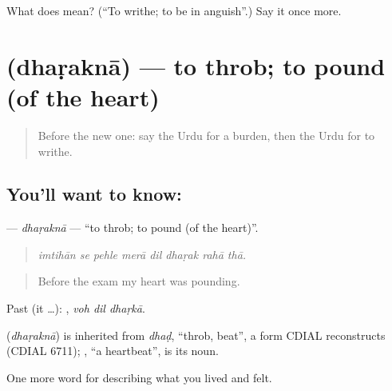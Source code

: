 \begin{tcolorbox}[breakable,colback=teal!4,colframe=teal!35!black,title={Before you move on}]
What does  mean? (\textquotedblleft{}To writhe; to be in anguish\textquotedblright{}.) Say it once more.
\end{tcolorbox}
\section[\texorpdfstring{\ur{دھڑکنا} (dhaṛaknā)}{دھڑکنا (dhaṛaknā)}]{ (dhaṛaknā) — to throb; to pound (of the heart)}

\label{lesson:UR-C446-dharakna}



\begin{quote}
Before the new one: say the Urdu for a burden, then the Urdu for to writhe.
\end{quote}

\subsection*{You'll want to know: }
\textbf{} — \emph{dhaṛaknā} — \textquotedblleft{}to throb; to pound (of the heart)\textquotedblright{}.

\begin{quote}
       
\end{quote}

\begin{quote}
\emph{imtihān se pehle merā dil dhaṛak rahā thā.}
\end{quote}

\begin{quote}
Before the exam my heart was pounding.
\end{quote}

Past (it …):   , \emph{voh dil dhaṛkā}.

\begin{cousinweb}
\textbf{} (\emph{dhaṛaknā}) is inherited from \emph{dhaḍ}, \textquotedblleft{}throb, beat\textquotedblright{}, a form CDIAL reconstructs (CDIAL 6711); \textbf{}, \textquotedblleft{}a heartbeat\textquotedblright{}, is its noun.
\end{cousinweb}

\begin{grammarlens}[title={What you've built}]
One more word for describing what you lived and felt.
\end{grammarlens}

